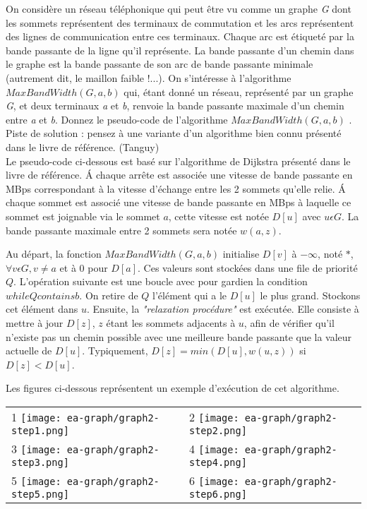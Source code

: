 On considère un réseau téléphonique qui peut être vu comme un graphe \textit{G} dont
les sommets représentent des terminaux de commutation et les arcs représentent
des lignes de communication entre ces terminaux. Chaque arc est étiqueté par la
bande passante de la ligne qu’il représente. La bande passante d’un chemin dans
le graphe est la bande passante de son arc de bande passante minimale (autrement
dit, le maillon faible !...). On s’intéresse à l’algorithme $MaxBandWidth(G, a, b)$
qui, étant donné un réseau, représenté par un graphe \textit{G}, et deux terminaux \textit{a} et \textit{b},
renvoie la bande passante maximale d’un chemin entre \textit{a} et \textit{b}. Donnez le pseudo-code de l’algorithme $MaxBandWidth(G, a, b)$ . Piste de solution : pensez à une
variante d’un algorithme bien connu présenté dans le livre de référence.
(Tanguy)\\

Le pseudo-code ci-dessous est basé sur l'algorithme de Dijkstra présenté dans le livre de référence.
Á chaque arrête est associée une vitesse de bande passante en MBps correspondant à la vitesse d'échange entre les 2 sommets qu'elle relie.
Á chaque sommet est associé une vitesse de bande passante en MBps à laquelle ce sommet est joignable via le sommet $a$, cette vitesse est notée $D[u]$ avec $u \epsilon G$.
La bande passante maximale entre 2 sommets sera notée $w(a, z)$.

Au départ, la fonction $MaxBandWidth(G, a, b)$ initialise $D[v]$ à $-\infty$, noté $*$, $\forall v \epsilon G, v\neq a$ et à $0$ pour $D[a]$.
Ces valeurs sont stockées dans une file de priorité $Q$.
L'opération suivante est une boucle avec pour gardien la condition $while Q contains b$.
On retire de $Q$ l'élément qui a le $D[u]$ le plus grand. Stockons cet élément dans $u$.
Ensuite, la \textit{"relaxation procédure"} est exécutée. Elle consiste à  mettre à jour $D[z]$, $z$ étant les sommets adjacents à $u$, afin de vérifier qu'il n'existe pas un chemin possible avec une meilleure bande passante que la valeur actuelle de $D[u]$. Typiquement, $D[z] = min(D[u], w(u, z))$ si $D[z] < D[u]$.



Les figures ci-dessous représentent un exemple d'exécution de cet algorithme.

\begin{tabular}{ll}
   1 \texttt{[image: ea-graph/graph2-step1.png]}&
   2 \texttt{[image: ea-graph/graph2-step2.png]} \\
	3 \texttt{[image: ea-graph/graph2-step3.png]} &
	4 \texttt{[image: ea-graph/graph2-step4.png]} \\
	5 \texttt{[image: ea-graph/graph2-step5.png]} &
	6 \texttt{[image: ea-graph/graph2-step6.png]} \\
\end{tabular}

